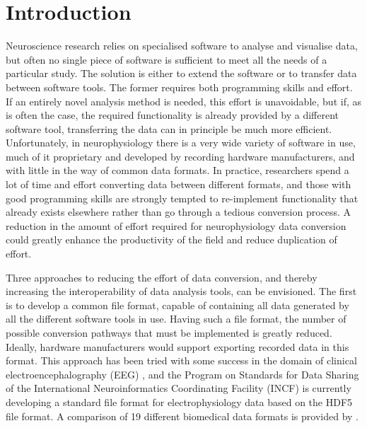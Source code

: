 \documentclass{frontiers}
\begin{document}
\section{Introduction}



Neuroscience research relies on specialised software to analyse and visualise data, but often no single piece of software is sufficient to meet all the needs of a particular study.
The solution is either to extend the software or to transfer data between software tools.
The former requires both programming skills and effort.
If an entirely novel analysis method is needed, this effort is unavoidable, but if, as is often the case, the required functionality is already provided by a different software tool, transferring the data can in principle be much more efficient.
Unfortunately, in neurophysiology there is a very wide variety of software in use, much of it proprietary and developed by recording hardware manufacturers, and with little in the way of common data formats.
In practice, researchers spend a lot of time and effort converting data between different formats, and those with good programming skills are strongly tempted to re-implement functionality that already exists elsewhere rather than go through a tedious conversion process.
A reduction in the amount of effort required for neurophysiology data conversion could greatly enhance the productivity of the field and reduce duplication of effort. 

Three approaches to reducing the effort of data conversion, and thereby increasing the interoperability of data analysis tools, can be envisioned.
The first is to develop a common file format, capable of containing all data generated by all the different software tools in use.
Having such a file format, the number of possible conversion pathways that must be implemented is greatly reduced.
Ideally, hardware manufacturers would support exporting recorded data in this format.
This approach has been tried with some success in the domain of clinical electroencephalography (EEG) \citep{Kemp1992, Kemp2003, Schloegl2006}, and the Program on Standards for Data Sharing of the International Neuroinformatics Coordinating Facility (INCF) is currently developing a standard file format for electrophysiology data \citep{Teeters2013} based on the HDF5 file format. A comparison of 19 different biomedical data formats is provided by \citet{Schloegl2010}.
\end{document}
